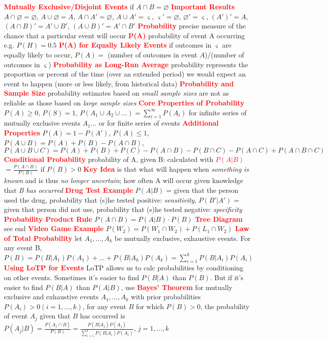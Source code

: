 \documentclass[10pt]{extarticle}
\let\oldtextbf\textbf
\renewcommand{\textbf}[1]{\textcolor{red}{\oldtextbf{#1}}}
\begin{document}
\textbf{Mutually Exclusive/Disjoint Events} if $A \cap B = \varnothing$
\textbf{Important Results} $A \cap \varnothing = \varnothing$, $A \cup \varnothing = A$, $A \cap A' = \varnothing$, $A \cup A' = \varsigma$, $\varsigma ' = \varnothing$, $\varnothing ' = \varsigma$, $(A')' = A$, $(A \cap B)' = A' \cup B'$, $(A \cup B)' = A' \cap B'$
\textbf{Probability} precise measure of the chance that a particular event will occur
\textbf{P(A)} probability of event A occurring e.g. $P(H) = 0.5$
\textbf{P(A) for Equally Likely Events} if outcomes in $\varsigma$ are equally likely to occur, $P(A) =$ (number of outcomes in event $A$)/(number of outcomes in $\varsigma$)
\textbf{Probability as Long-Run Average} probability represents the proportion or percent of the time (over an extended period) we would expect an event to happen (more or less likely, from historical data) 
\textbf{Probability and Sample Size} probability estimates based on \emph{small sample sizes} are not as reliable as those based on \emph{large sample sizes}
\textbf{Core Properties of Probability} $P(A) \geq 0$, $P(S) = 1$, $P(A_{1}\cup A_{2}\cup ...) = \sum_{i=1}^{\infty}P(A_{i})$ for infinite series of mutually exclusive events $A_{1}...$ or for finite series of events
\textbf{Additional Properties} $P(A) = 1 - P(A')$, $P(A) \leq 1$, $P(A\cup B) = P(A) + P(B) - P(A\cap B)$, $P(A\cup B\cup C) = P(A) + P(B) + P(C) - P(A\cap B) - P(B\cap C) - P(A\cap C) + P(A\cap B\cap C)$
\textbf{Conditional Probability} probability of A, given B: calculated with
\textbf{$P(A|B)$} $= \frac{P(A\cap B)}{P(B)}$ if $P(B)>0$
\textbf{Key Idea} is that what will happen when \emph{something is known} and is thus \emph{no longer uncertain}; how often A will occur given knowledge that \emph{B has occurred}
\textbf{Drug Test Example} $P(A|B)$ = given that the person used the drug, probability that (s)he tested positive: \emph{sensitivity}, $P(B'|A')$ = given that person did not use, probability that (s)he tested negative: \emph{specificity}
\textbf{Probability Product Rule} $P(A\cap B) = P(A|B) \cdot P(B)$ 
\textbf{Tree Diagram} see end
\textbf{Video Game Example} $P(W_{2}) = P(W_{1}\cap W_{2}) + P(L_{1}\cap W_{2})$
\textbf{Law of Total Probability} let $A_{1},...,A_{k}$ be mutually exclusive, exhaustive events. For any event B, $P(B) = P(B|A_{1})P(A_{1})+...+P(B|A_{k})P(A_{k}) = \sum_{i=1}^{k}P(B|A_{i})P(A_{i})$
\textbf{Using LoTP for Events} LoTP allows us to calc probabilities by conditioning on other events. Sometimes it's easier to find $P(B|A)$ than $P(B)$. But if it's easier to find $P(B|A)$ than $P(A|B)$, use
\textbf{Bayes' Theorem} for mutually exclusive and exhaustive events $A_{1},...,A_{k}$ with prior probabilities $P(A_{i})>0 (i=1,...,k)$, for any event $B$ for which $P(B)>0$, the probability of event $A_{j}$ given that $B$ has occurred is $P(A_{j}|B) = \frac{P(A_{j}\cap B)}{P(B)} = \frac{P(B|A_{j})P(A_{j})}{\sum_{i=1}^{k}P(B|A_{i})P(A_{i})}$, $j=1,...,k$
\end{document}
